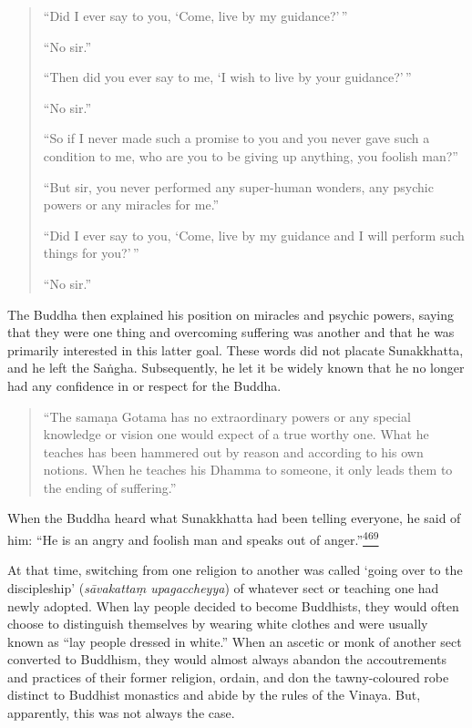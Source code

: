 \begin{quote}
``Did I ever say to you, `Come, live by my guidance?'\,''

``No sir.''

``Then did you ever say to me, `I wish to live by your guidance?'\,''

``No sir.''

``So if I never made such a promise to you and you never gave such a
condition to me, who are you to be giving up anything, you foolish
man?''

``But sir, you never performed any super-human wonders, any psychic
powers or any miracles for me.''

``Did I ever say to you, `Come, live by my guidance and I will perform
such things for you?'\,''

``No sir.''
\end{quote}

The Buddha then explained his position on miracles and psychic powers,
saying that they were one thing and overcoming suffering was another and
that he was primarily interested in this latter goal. These words did
not placate Sunakkhatta, and he left the Saṅgha. Subsequently, he let it
be widely known that he no longer had any confidence in or respect for
the Buddha.

\begin{quote}
``The samaṇa Gotama has no extraordinary powers or any special knowledge
or vision one would expect of a true worthy one. What he teaches has
been hammered out by reason and according to his own notions. When he
teaches his Dhamma to someone, it only leads them to the ending of
suffering.''
\end{quote}

When the Buddha heard what Sunakkhatta had been telling everyone, he
said of him: ``He is an angry and foolish man and speaks out of
anger.''\label{footprints_split_013.html_fnref469}\hyperref[footprints_split_025.htmlux5cux23fn469]{\textsuperscript{469}}

At that time, switching from one religion to another was called `going
over to the discipleship' (\emph{sāvakattaṃ upagaccheyya}) of whatever
sect or teaching one had newly adopted. When lay people decided to
become Buddhists, they would often choose to distinguish themselves by
wearing white clothes and were usually known as ``lay people dressed in
white.'' When an ascetic or monk of another sect converted to Buddhism,
they would almost always abandon the accoutrements and practices of
their former religion, ordain, and don the tawny-coloured robe distinct
to Buddhist monastics and abide by the rules of the Vinaya. But,
apparently, this was not always the case.

